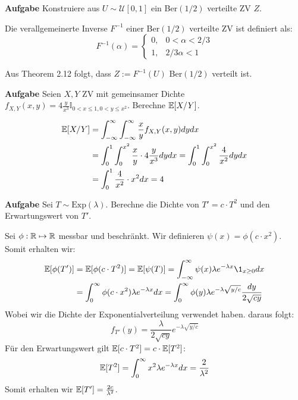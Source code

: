 \hrulefill

\textbf{Aufgabe}
Konstruiere aus $U \sim \mathcal U[0,1]$ ein Ber$(1/2)$ verteilte ZV $Z$. \smallskip

Die verallgemeinerte Inverse $F^{-1}$ einer Ber$(1/2)$ verteilte ZV ist definiert als:
$$F^{-1}(\alpha) = \begin{cases}
	0, & 0 < \alpha < 2/3 \\
	1, & 2/3 \alpha < 1
\end{cases}$$

Aus Theorem 2.12 folgt, dass $Z:=F^{-1}(U)$ Ber$(1/2)$ verteilt ist.

\hrulefill

\textbf{Aufgabe}
Seien $X,Y$ ZV mit gemeinsamer Dichte $f_{X,Y}(x,y) = 4 \frac{y}{x^3} \mathbb{I}_{0 < x \leq 1, 0 < y \leq x^2}$. Berechne $\mathbb{E}[X / Y]$. \medskip

\begin{align*}
	\mathbb{E}[X / Y] &= \int_{- \infty}^\infty \int_{- \infty}^\infty \frac{x}{y} f_{X,Y}(x,y) dy dx \\
	&= \int_0^1 \int_0^{x^2} \frac{x}{y} \cdot 4 \frac{y}{x^3} dydx = \int_0^1 \int_0^{x^2}\frac{4}{x^2} dydx \\
	&= \int_0^1 \frac{4}{x^2} \cdot x^2 dx = 4
\end{align*}

\hrulefill

\textbf{Aufgabe}
Sei $T \sim \text{Exp}(\lambda)$. Berechne die Dichte von $T' = c \cdot T^2$ und den Erwartungswert von $T'$. \medskip

Sei $\phi: \mathbb{R} \mapsto \mathbb{R}$ messbar und beschränkt. Wir definieren $\psi(x) = \phi(c \cdot x^2)$. Somit erhalten wir:
\begin{align*}
	\E[\phi(T')] &= \E[\phi(c \cdot T^2)] = \E[\psi(T)] = \int_{-\infty}^\infty \psi(x) \lambda e^{-\lambda x}\1_{x \geq 0}dx \\
	&= \int_0^\infty \phi(c \cdot x^2) \lambda e^{-\lambda x}dx = \int_0^\infty \phi(y) \lambda e^{-\lambda \sqrt{y / c}} \frac{dy}{2 \sqrt{cy}} \\
\end{align*}
Wobei wir die Dichte der Exponentialverteilung verwendet haben. daraus folgt:
$$f_{T'}(y) = \frac{\lambda}{2 \sqrt{cy}} e^{-\lambda \sqrt{y / c}}$$
Für den Erwartungswert gilt $\mathbb{E}[c \cdot T^2] = c \cdot \mathbb{E}[T^2]$:
$$\mathbb{E}[T^2] = \int_{0}^\infty x^2 \lambda e^{-\lambda x}dx = \frac{2}{\lambda^2}$$
Somit erhalten wir $\mathbb{E}[T'] = \frac{2c}{\lambda^2}$.

\hrulefill

